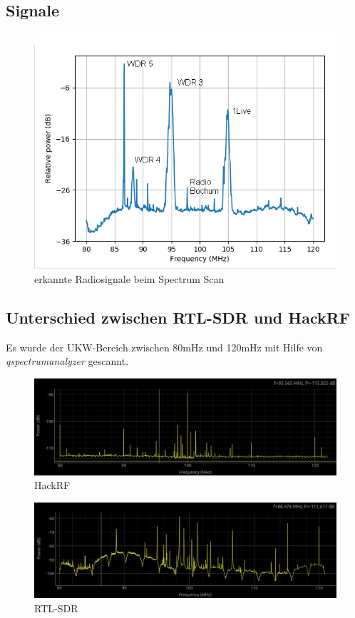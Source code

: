 \documentclass[12pt,a4paper]{article}
\begin{document}
\subsection*{Signale}
\begin{figure}[hbt!]
	\centering
		\includegraphics[width=1\textwidth ]
		{Bilder/a3_ukw.png}
		\caption{erkannte Radiosignale beim Spectrum Scan}
\end{figure}

\subsection*{Unterschied zwischen RTL-SDR und HackRF}
Es wurde der UKW-Bereich zwischen 80mHz und 120mHz mit Hilfe von \textit{qspectrumanalyzer} gescannt.

\begin{figure}[hbt!]
	\centering
		\includegraphics[width=1\textwidth ]
		{Bilder/a3_hackrf.jpg}
		\caption{HackRF}
\end{figure}

\begin{figure}[hbt!]
	\centering
		\includegraphics[width=1\textwidth ]
		{Bilder/a3_rtl_sdr.jpg}
		\caption{RTL-SDR}
\end{figure}
\newpage
\end{document}
